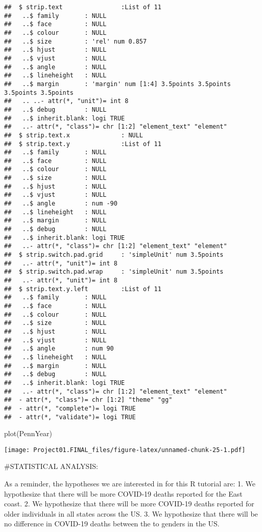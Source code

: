\documentclass[
]{article}
\newenvironment{Shaded}{\begin{snugshade}}{\end{snugshade}}
\newcommand{\FunctionTok}[1]{\textcolor[rgb]{0.00,0.00,0.00}{#1}}
\newcommand{\NormalTok}[1]{#1}
\begin{document}
\begin{verbatim}
##  $ strip.text                :List of 11
##   ..$ family       : NULL
##   ..$ face         : NULL
##   ..$ colour       : NULL
##   ..$ size         : 'rel' num 0.857
##   ..$ hjust        : NULL
##   ..$ vjust        : NULL
##   ..$ angle        : NULL
##   ..$ lineheight   : NULL
##   ..$ margin       : 'margin' num [1:4] 3.5points 3.5points 3.5points 3.5points
##   .. ..- attr(*, "unit")= int 8
##   ..$ debug        : NULL
##   ..$ inherit.blank: logi TRUE
##   ..- attr(*, "class")= chr [1:2] "element_text" "element"
##  $ strip.text.x              : NULL
##  $ strip.text.y              :List of 11
##   ..$ family       : NULL
##   ..$ face         : NULL
##   ..$ colour       : NULL
##   ..$ size         : NULL
##   ..$ hjust        : NULL
##   ..$ vjust        : NULL
##   ..$ angle        : num -90
##   ..$ lineheight   : NULL
##   ..$ margin       : NULL
##   ..$ debug        : NULL
##   ..$ inherit.blank: logi TRUE
##   ..- attr(*, "class")= chr [1:2] "element_text" "element"
##  $ strip.switch.pad.grid     : 'simpleUnit' num 3.5points
##   ..- attr(*, "unit")= int 8
##  $ strip.switch.pad.wrap     : 'simpleUnit' num 3.5points
##   ..- attr(*, "unit")= int 8
##  $ strip.text.y.left         :List of 11
##   ..$ family       : NULL
##   ..$ face         : NULL
##   ..$ colour       : NULL
##   ..$ size         : NULL
##   ..$ hjust        : NULL
##   ..$ vjust        : NULL
##   ..$ angle        : num 90
##   ..$ lineheight   : NULL
##   ..$ margin       : NULL
##   ..$ debug        : NULL
##   ..$ inherit.blank: logi TRUE
##   ..- attr(*, "class")= chr [1:2] "element_text" "element"
##  - attr(*, "class")= chr [1:2] "theme" "gg"
##  - attr(*, "complete")= logi TRUE
##  - attr(*, "validate")= logi TRUE
\end{verbatim}

\begin{Shaded}
\begin{Highlighting}[]
\FunctionTok{plot}\NormalTok{(PennYear)}
\end{Highlighting}
\end{Shaded}

\texttt{[image: Project01.FINAL\_files/figure-latex/unnamed-chunk-25-1.pdf]}

\#STATISTICAL ANALYSIS:

As a reminder, the hypotheses we are interested in for this R tutorial
are: 1. We hypothesize that there will be more COVID-19 deaths reported
for the East coast. 2. We hypothesize that there will be more COVID-19
deaths reported for older individuals in all states across the US. 3. We
hypothesize that there will be no difference in COVID-19 deaths between
the to genders in the US.
\end{document}
